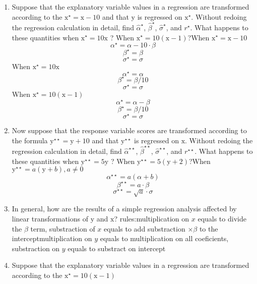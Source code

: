 \documentclass[]{article}
\begin{document}
\begin{enumerate}
\def\labelenumi{\arabic{enumi}.}
\item
  Suppose that the explanatory variable values in a regression are
  transformed according to the \(\mathrm{x}^{\star}=\mathrm{x}-10\) and
  that \(\mathrm{y}\) is regressed on \(\mathrm{x}^{\star}\). Without
  redoing the regression calculation in detail, find
  \(\hat{\alpha}^{\star}\), \(\hat{\beta}^{\star}\),
  \(\hat{\sigma}^{\star}\), and \(r^{\star}\). What happens to these
  quantities when \(\mathrm{x}^{\star}=10\mathrm{x}\) ? When
  \(\mathrm{x}^{\star}=10(\mathrm{x}-1)\)?\newline When
  \(\mathrm{x}^{\star}=\mathrm{x}-10\)
  \[\alpha^{\star} = \alpha - 10 \cdot \beta\] \[\beta^{\star} = \beta\]
  \[\sigma^{\star} = \sigma\] When \(\mathrm{x}^{\star}=10\mathrm{x}\)
  \[\alpha^{\star} = \alpha\] \[\beta^{\star} = \beta/10\]
  \[\sigma^{\star} = \sigma\] When
  \(\mathrm{x}^{\star}=10(\mathrm{x}-1)\)
  \[\alpha^{\star} = \alpha-\beta\] \[\beta^{\star} = \beta/10\]
  \[\sigma^{\star} = \sigma\]
\item
  Now suppose that the response variable scores are transformed
  according to the formula \(\mathrm{y}^{\star\star}= \mathrm{y}+10\)
  and that \(\mathrm{y}^{\star\star}\) is regressed on \(\mathrm{x}\).
  Without redoing the regression calculation in detail, find
  \(\hat{\alpha}^{\star\star}\), \(\hat{\beta}^{\star\star}\),
  \(\hat{\sigma}^{\star\star}\), and \(r^{\star\star}\). What happens to
  these quantities when \(\mathrm{y}^{\star\star}=5\mathrm{y}\) ? When
  \(\mathrm{y}^{\star\star}=5(\mathrm{y}+2)\)?\newline When
  \(\mathrm{y}^{\star\star}=a(\mathrm{y}+b) , a\neq0\)
  \[\alpha^{\star\star} = a(\alpha+b)\]
  \[\beta^{\star\star} = a\cdot\beta\]
  \[\sigma^{\star\star} = \sqrt{a}\cdot\sigma\]
\item
  In general, how are the results of a simple regression analysis
  affected by linear transformations of \(\mathrm{y}\) and
  \(\mathrm{x}\)? rules:\newline multiplication on \(x\) equals to
  divide the \(\beta\) term, substraction of \(x\) equals to add
  substraction \(\times \beta\) to the intercept\newline multiplication
  on \(y\) equals to multiplication on all coeficients, substraction on
  \(y\) equals to substract on intercept
\item
  Suppose that the explanatory variable values in a regression are
  transformed according to the \(\mathrm{x}^{\star}=10(\mathrm{x}-1)\)

\end{enumerate}
\end{document}
